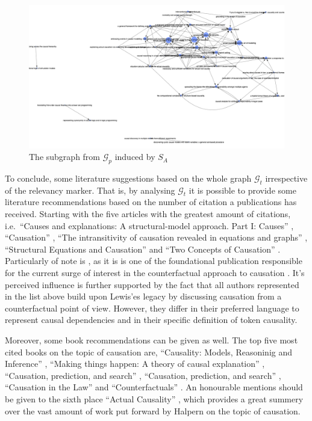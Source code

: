 \documentclass[11pt,a4paper]{book}
\theoremstyle{definition}
\theoremstyle{definition}
\theoremstyle{definition}
\theoremstyle{remark}
\newcommand{\prset}{S_{A}}
\newcommand{\tgraph}{\mathcal{G}_{t}}
\newcommand{\pgraph}{\mathcal{G}_{p}}
\begin{document}
\begin{figure}
\includegraphics[width=\textwidth]{important_pgraph.png}
\caption{The subgraph from $\pgraph$ induced by $\prset$}
\label{fig:pgraph-important}
\end{figure}




To conclude, some literature suggestions based on the whole graph $\tgraph$ irrespective of the relevancy marker. 
That is, by analysing $\tgraph$ it is possible to provide some literature recommendations based on the number of citation a publications has received. 
Starting with the five articles with the greatest amount of citations, i.e.\ 
``Causes and explanations: A structural-model approach. Part I: Causes'' \parencite{halpern2005causes}, 
``Causation'' \parencite{lewis1974causation},
``The intransitivity of causation revealed in equations and graphs'' \parencite{hitchcock2001intransitivity}, 
``Structural Equations and Causation'' \parencite{hall2007structural} and 
``Two Concepts of Causation'' \parencite{hall2004two}.
Particularly of note is \parencite{lewis1974causation}, as it is is one of the foundational publication responsible for the current surge of interest in the counterfactual approach to causation \parencite{beebee2009oxford}.
It's perceived influence is further supported by the fact that all authors represented in the list above build upon Lewis'es legacy by discussing causation from a counterfactual point of view. 
However, they differ in their preferred language to represent causal dependencies and in their specific definition of token causality. 


Moreover, some book recommendations can be given as well. The top five most cited books on the topic of causation are, ``Causality: Models, Reasoninig and Inference'' \parencite{pearl2009causality}, ``Making things happen: A theory of causal explanation'' \parencite{woodward2005making},
``Causation, prediction, and search'' \parencite{spirtes2000causation}, ``Causation, prediction, and search'' \parencite{spirtes2000causation}, ``Causation in the Law'' \parencite{hart1985causation}  and ``Counterfactuals'' \parencite{lewis2013counterfactuals}. An honourable mentions should be given to the sixth place ``Actual Causality'' \parencite{halpern2016actual}, which provides a great summery over the vast amount of work put forward by Halpern
on the topic of causation.
\end{document}
